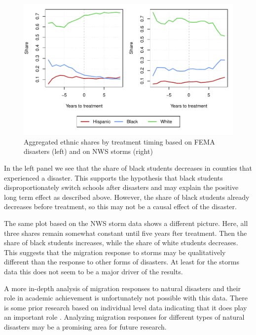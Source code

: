 \begin{figure}[!h]
	\centering
	\includegraphics[scale=1]{"../Code & Data/EthnicComposition.pdf"}
	\caption{Aggregated ethnic shares by treatment timing based on FEMA disasters (left) and on NWS storms (right)}
	\label{EthnicComposition}
\end{figure}

In the left panel we see that the share of black students decreases in counties that experienced a disaster. This supports the hypothesis that black students disproportionately switch schools after disasters and may explain the positive long term effect as described above. However, the share of black students already decreases before treatment, so this may not be a causal effect of the disaster.

The same plot based on the NWS storm data shows a different picture. Here, all three shares remain somewhat constant until five years fter treatment. Then the share of black students increases, while the share of white students decreases. This suggests that the migration response to storms may be qualitatively different than the response to other forms of disasters. At least for the storms data this does not seem to be a major driver of the results.

A more in-depth analysis of migration responses to natural disasters and their role in academic achievement is unfortunately not possible with this data. There is some prior research based on individual level data indicating that it does play an important role \citep[for example][]{Sacerdote_2012}. Analyzing migration responses for different types of natural disasters may be a promising area for future research.

